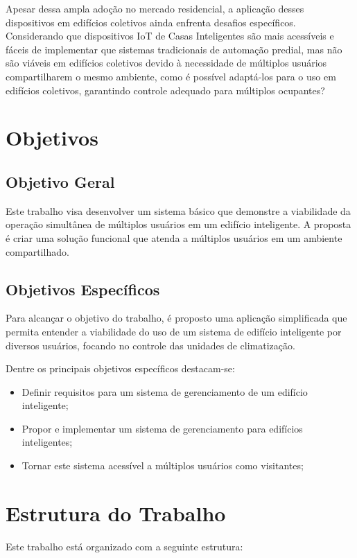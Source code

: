 Apesar dessa ampla adoção no mercado residencial, a aplicação desses dispositivos em edifícios coletivos ainda enfrenta desafios específicos.
Considerando que dispositivos IoT de Casas Inteligentes são mais acessíveis e fáceis de implementar que sistemas tradicionais de automação predial,
mas não são viáveis em edifícios coletivos devido à necessidade de múltiplos usuários compartilharem o mesmo ambiente, como é possível adaptá-los
para o uso em edifícios coletivos, garantindo controle adequado para múltiplos ocupantes?


\section{Objetivos}
\subsection{Objetivo Geral}
Este trabalho visa desenvolver um sistema básico que demonstre a viabilidade da operação simultânea de múltiplos usuários
em um edifício inteligente. A proposta é criar uma solução funcional que atenda a múltiplos usuários em um ambiente compartilhado. 

\subsection{Objetivos Específicos}

Para alcançar o objetivo do trabalho, é proposto uma aplicação simplificada que permita entender a viabilidade do uso de um 
sistema de edifício inteligente por diversos usuários, focando no controle das unidades de climatização.

Dentre os principais objetivos específicos destacam-se:

\begin{itemize}
    \item Definir requisitos para um sistema de gerenciamento de um edifício inteligente;
    \item Propor e implementar um sistema de gerenciamento para edifícios inteligentes;
    \item Tornar este sistema acessível a múltiplos usuários como visitantes;
\end{itemize}

\section{Estrutura do Trabalho}
Este trabalho está organizado com a seguinte estrutura:


